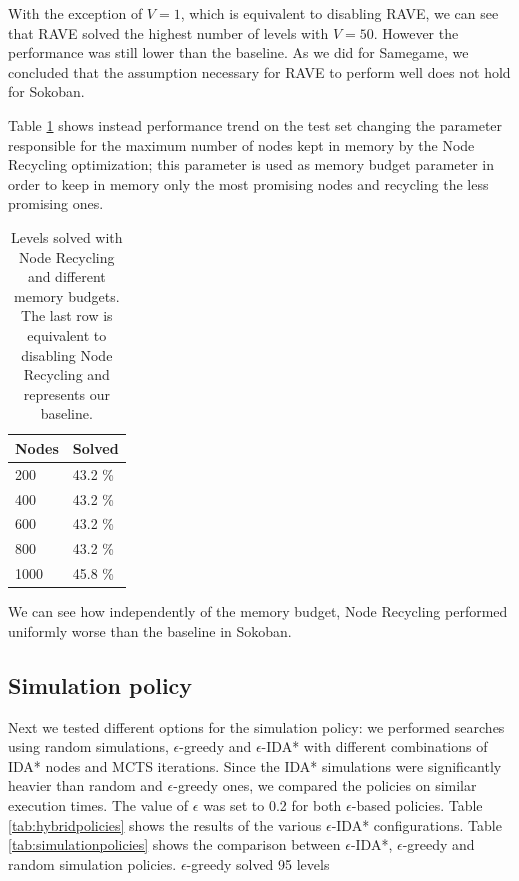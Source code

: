 \medskip\noindent
With the exception of $V=1$, which is equivalent to disabling RAVE, we can see that RAVE solved the highest number of levels with $V = 50$. However the performance was still lower than the baseline. As we did for Samegame, we concluded that the assumption necessary for RAVE to perform well does not hold for Sokoban.

\medskip\noindent
Table \ref{tab:sokoban_tuningrecycling} shows instead performance trend on the test set changing the parameter responsible for the maximum number of nodes kept in memory by the Node Recycling optimization; this parameter is used as memory budget parameter in order to keep in memory only the most promising nodes and recycling the less promising ones.
\begin{table}[!h]
    \centering
    \begin{tabular}{l|l}
        Nodes & Solved \\
        \hline 
        200 & 43.2 \% \\
        400 & 43.2 \% \\
        600 & 43.2 \% \\
        800 & 43.2 \% \\
        1000 & 45.8 \% \\
    \end{tabular}
    \caption[Node Recycling memory budgets evaluation]{Levels solved with Node Recycling and different memory budgets. The last row is equivalent to disabling Node Recycling and represents our baseline.}
    \label{tab:sokoban_tuningrecycling}
\end{table}
We can see how independently of the memory budget, Node Recycling performed uniformly worse than the baseline in Sokoban.

\subsection{Simulation policy}
\medskip\noindent
Next we tested different options for the simulation policy: we performed searches using random simulations, $\epsilon$-greedy and $\epsilon$-IDA* with different combinations of IDA* nodes and MCTS iterations. Since the IDA* simulations were significantly heavier than random and $\epsilon$-greedy ones, we compared the policies on similar execution times. The value of $\epsilon$ was set to 0.2 for both $\epsilon$-based policies. Table \ref{tab:hybridpolicies} shows the results of the various $\epsilon$-IDA* configurations. Table \ref{tab:simulationpolicies} shows the comparison between $\epsilon$-IDA*, $\epsilon$-greedy and random simulation policies. $\epsilon$-greedy solved 95 levels

